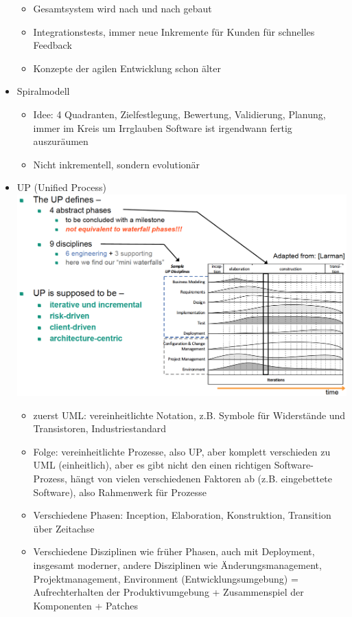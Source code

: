 \documentclass[paper=a4, fontsize=11pt]{scrartcl} %
\numberwithin{equation}{section} %
\numberwithin{figure}{section} %
\numberwithin{table}{section} %
\begin{document}
\begin{itemize}
\begin{itemize}
    \item Gesamtsystem wird nach und nach gebaut
    \item Integrationstests, immer neue Inkremente für Kunden für schnelles Feedback
    \item Konzepte der agilen Entwicklung schon älter
  \end{itemize}
  \item Spiralmodell
  \begin{itemize}
    \item Idee: 4 Quadranten, Zielfestlegung, Bewertung, Validierung, Planung, immer im Kreis um Irrglauben Software ist irgendwann fertig auszuräumen
    \item Nicht inkrementell, sondern evolutionär
  \end{itemize}
  \item UP (Unified Process)\\
  \includegraphics[width=\linewidth]{imgs/up}
  \begin{itemize}
    \item zuerst UML: vereinheitlichte Notation, z.B. Symbole für Widerstände und Transistoren, Industriestandard
    \item Folge: vereinheitlichte Prozesse, also UP, aber komplett verschieden zu UML (einheitlich), aber es gibt nicht den einen richtigen Software-Prozess, hängt von vielen verschiedenen Faktoren ab (z.B. eingebettete Software), also Rahmenwerk für Prozesse
    \item Verschiedene Phasen: Inception, Elaboration, Konstruktion, Transition über Zeitachse
    \item Verschiedene Disziplinen wie früher Phasen, auch mit Deployment, insgesamt moderner, andere Disziplinen wie Änderungsmanagement, Projektmanagement, Environment (Entwicklungsumgebung) = Aufrechterhalten der Produktivumgebung + Zusammenspiel der Komponenten + Patches

\end{itemize}
\end{itemize}
\end{document}
